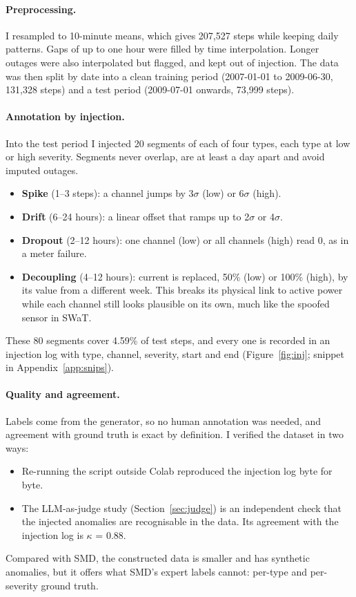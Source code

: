 \documentclass[11pt]{article}
\begin{document}
\paragraph{Preprocessing.} I resampled to 10-minute means, which gives 207,527 steps while keeping daily patterns. Gaps of up to one hour were filled by time interpolation. Longer outages were also interpolated but flagged, and kept out of injection. The data was then split by date into a clean training period (2007-01-01 to 2009-06-30, 131,328 steps) and a test period (2009-07-01 onwards, 73,999 steps).

\paragraph{Annotation by injection.} Into the test period I injected 20 segments of each of four types, each type at low or high severity. Segments never overlap, are at least a day apart and avoid imputed outages.
\begin{itemize}
\item \textbf{Spike} (1--3 steps): a channel jumps by 3$\sigma$ (low) or 6$\sigma$ (high).
\item \textbf{Drift} (6--24 hours): a linear offset that ramps up to 2$\sigma$ or 4$\sigma$.
\item \textbf{Dropout} (2--12 hours): one channel (low) or all channels (high) read 0, as in a meter failure.
\item \textbf{Decoupling} (4--12 hours): current is replaced, 50\% (low) or 100\% (high), by its value from a different week. This breaks its physical link to active power while each channel still looks plausible on its own, much like the spoofed sensor in SWaT.
\end{itemize}
These 80 segments cover 4.59\% of test steps, and every one is recorded in an injection log with type, channel, severity, start and end (Figure~\ref{fig:inj}; snippet in Appendix~\ref{app:snips}).

\paragraph{Quality and agreement.} Labels come from the generator, so no human annotation was needed, and agreement with ground truth is exact by definition. I verified the dataset in two ways:
\begin{itemize}
\item Re-running the script outside Colab reproduced the injection log byte for byte.
\item The LLM-as-judge study (Section~\ref{sec:judge}) is an independent check that the injected anomalies are recognisable in the data. Its agreement with the injection log is $\kappa$ = 0.88.
\end{itemize}
Compared with SMD, the constructed data is smaller and has synthetic anomalies, but it offers what SMD's expert labels cannot: per-type and per-severity ground truth.
\end{document}
